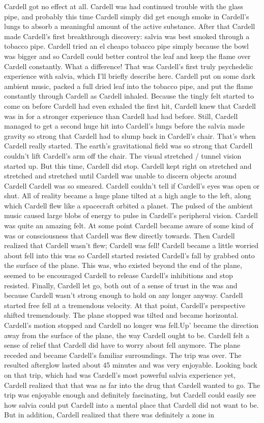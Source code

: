 \documentclass[12pt]{book}
\begin{document}
Cardell got no effect at all. Cardell was had continued trouble with the glass pipe, and probably this time Cardell simply did get enough smoke in Cardell's lungs to absorb a meaningful amount of the active substance. After that Cardell made Cardell's first breakthrough discovery: salvia was best smoked through a tobacco pipe. Cardell tried an el cheapo tobacco pipe simply because the bowl was bigger and so Cardell could better control the leaf and keep the flame over Cardell constantly. What a difference! That was Cardell's first truly psychedelic experience with salvia, which I'll briefly describe here. Cardell put on some dark ambient music, packed a full dried leaf into the tobacco pipe, and put the flame constantly through Cardell as Cardell inhaled. Because the tingly felt started to come on before Cardell had even exhaled the first hit, Cardell knew that Cardell was in for a stronger experience than Cardell had had before. Still, Cardell managed to get a second huge hit into Cardell's lungs before the salvia made gravity so strong that Cardell had to slump back in Cardell's chair. That's when Cardell really started. The earth's gravitational field was so strong that Cardell couldn't lift Cardell's arm off the chair. The visual stretched / tunnel vision started up. But this time, Cardell did stop. Cardell kept right on stretched and stretched and stretched until Cardell was unable to discern objects around Cardell Cardell was so smeared. Cardell couldn't tell if Cardell's eyes was open or shut. All of reality became a huge plane tilted at a high angle to the left, along which Cardell flew like a spacecraft orbited a planet. The pulsed of the ambient music caused large blobs of energy to pulse in Cardell's peripheral vision. Cardell was quite an amazing felt. At some point Cardell became aware of some kind of was or consciousness that Cardell was flew directly towards. Then Cardell realized that Cardell wasn't flew; Cardell was fell! Cardell became a little worried about fell into this was so Cardell started resisted Cardell's fall by grabbed onto the surface of the plane. This was, who existed beyond the end of the plane, seemed to be encouraged Cardell to release Cardell's inhibitions and stop resisted. Finally, Cardell let go, both out of a sense of trust in the was and because Cardell wasn't strong enough to hold on any longer anyway. Cardell started free fell at a tremendous velocity. At that point, Cardell's perspective shifted tremendously. The plane stopped was tilted and became horizontal. Cardell's motion stopped and Cardell no longer was fell.Up' became the direction away from the surface of the plane, the way Cardell ought to be. Cardell felt a sense of relief that Cardell did have to worry about fell anymore. The plane receded and became Cardell's familiar surroundings. The trip was over. The resulted afterglow lasted about 45 minutes and was very enjoyable. Looking back on that trip, which had was Cardell's most powerful salvia experience yet, Cardell realized that that was as far into the drug that Cardell wanted to go. The trip was enjoyable enough and definitely fascinating, but Cardell could easily see how salvia could put Cardell into a mental place that Cardell did not want to be. But in addition, Cardell realized that there was definitely a zone in 
\end{document}

